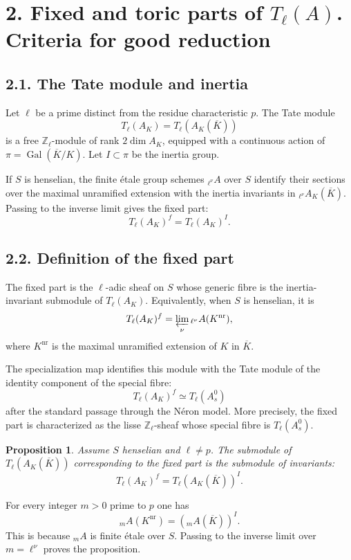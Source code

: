 \documentclass[11pt]{article}
\theoremstyle{plain}
\newtheorem{proposition}[theorem]{Proposition}
\theoremstyle{definition}
\theoremstyle{remark}
\newcommand{\bZ}{\mathbb Z}
\begin{document}
\section*{2. Fixed and toric parts of \(T_\ell(A)\). Criteria for good reduction}

\subsection*{2.1. The Tate module and inertia}

Let \(\ell\) be a prime distinct from the residue characteristic \(p\). The Tate
module
\[
T_\ell(A_K)=T_\ell(A_K(\overline K))
\]
is a free \(\bZ_\ell\)-module of rank \(2\dim A_K\), equipped with a continuous
action of \(\pi=\operatorname{Gal}(\overline K/K)\). Let \(I\subset \pi\) be the
inertia group.

If \(S\) is henselian, the finite étale group schemes \({}_{\ell^\nu}A\) over
\(S\) identify their sections over the maximal unramified extension with the
inertia invariants in \({}_{\ell^\nu}A_K(\overline K)\). Passing to the inverse
limit gives the fixed part:
\[
T_\ell(A_K)^f=T_\ell(A_K)^I.
\]

\subsection*{2.2. Definition of the fixed part}

The fixed part is the \(\ell\)-adic sheaf on \(S\) whose generic fibre is the
inertia-invariant submodule of \(T_\ell(A_K)\). Equivalently, when \(S\) is
henselian, it is
\[
T_\ell(A_K)^f=\varprojlim_\nu
{}_{\ell^\nu}A(K^{\operatorname{nr}}),
\]
where \(K^{\operatorname{nr}}\) is the maximal unramified extension of \(K\) in
\(\overline K\).

The specialization map identifies this module with the Tate module of the
identity component of the special fibre:
\[
T_\ell(A_K)^f\simeq T_\ell(A_s^0)
\]
after the standard passage through the Néron model. More precisely, the fixed
part is characterized as the lisse \(\bZ_\ell\)-sheaf whose special fibre is
\(T_\ell(A_s^0)\).

\begin{proposition}
Assume \(S\) henselian and \(\ell\neq p\). The submodule of
\(T_\ell(A_K(\overline K))\) corresponding to the fixed part is the submodule of
invariants:
\[
T_\ell(A_K)^f=T_\ell(A_K(\overline K))^I.
\]
\end{proposition}

For every integer \(m>0\) prime to \(p\) one has
\[
{}_mA(K^{\operatorname{nr}})
=({}_mA(\overline K))^I.
\]
This is because \({}_mA\) is finite étale over \(S\). Passing to the inverse
limit over \(m=\ell^\nu\) proves the proposition.
\end{document}
